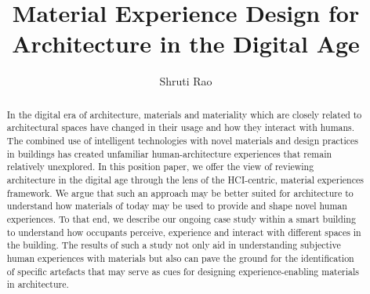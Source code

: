\documentclass[manuscript, anonymous, review]{acmart}
\begin{document}
\title{Material Experience Design for Architecture in the Digital Age}

\author{Shruti Rao}


\renewcommand{\shortauthors}{Rao et al.}

\begin{abstract}


In the digital era of architecture, materials and materiality which are closely related to architectural spaces have changed in their usage and how they interact with humans. The combined use of intelligent technologies with novel materials and design practices in buildings has created unfamiliar human-architecture experiences that remain relatively unexplored. In this position paper, we offer the view of reviewing architecture in the digital age through the lens of the HCI-centric, material experiences framework. We argue that such an approach may be better suited for architecture to understand how materials of today may be used to provide and shape novel human experiences. To that end, we describe our ongoing case study within a smart building to understand how occupants perceive, experience and interact with different spaces in the building. The results of such a study not only aid in understanding subjective human experiences with materials but also can pave the ground for the identification of specific artefacts that may serve as cues for designing experience-enabling materials in architecture.
\end{abstract}
\end{document}
